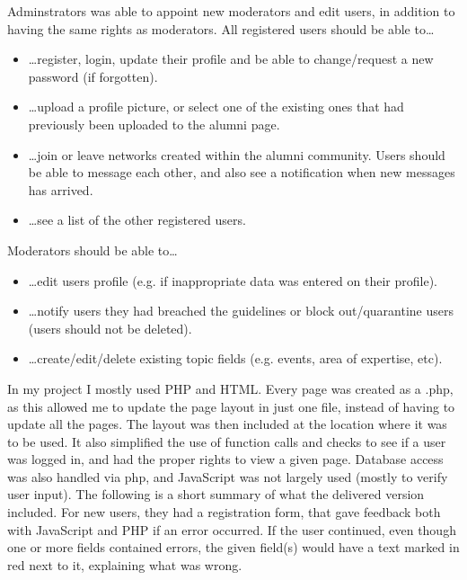 Adminstrators was able to appoint new moderators and edit users, in addition to having the same rights as moderators.
\vspace{0.5em}\newline	
All registered users should be able to\ldots
\begin{itemize}
	\item \ldots register, login, update their profile and be able to change/request a new password (if	forgotten).
	\item \ldots upload a profile picture, or select one of the existing ones that had previously been uploaded to the alumni page.
	\item \ldots join or leave networks created within the alumni community. Users should be able to message each other, and also see a notification when new messages has arrived.
	\item \ldots see a list of the other registered users.
\end{itemize}
\newpage\noindent
Moderators should be able to\ldots
\begin{itemize}
	\item \ldots edit users profile (e.g. if inappropriate data was entered on their profile).
	\item \ldots notify users they had breached the guidelines or block out/quarantine users (users should not be deleted).
	\item \ldots create/edit/delete existing topic fields (e.g. events, area of expertise, etc).
\end{itemize}
In my project I mostly used PHP and HTML. 
Every page was created as a .php, as this allowed me to update the page layout in just one file, instead of having to update all the pages. 
The layout was then included at the location where it was to be used. 
It also simplified the use of function calls and checks to see if a user was logged in, and had the proper rights to view a given page. 
Database access was also handled via php, and JavaScript was not largely used (mostly to verify user input).
\vspace{0.5em}\newline
The following is a short summary of what the delivered version included. 
For new users, they had a registration form, that gave feedback both with JavaScript and PHP if an error occurred. 
If the user continued, even though one or more fields contained errors, the given field(s) would have a text marked in red next to it, explaining what was wrong. 
